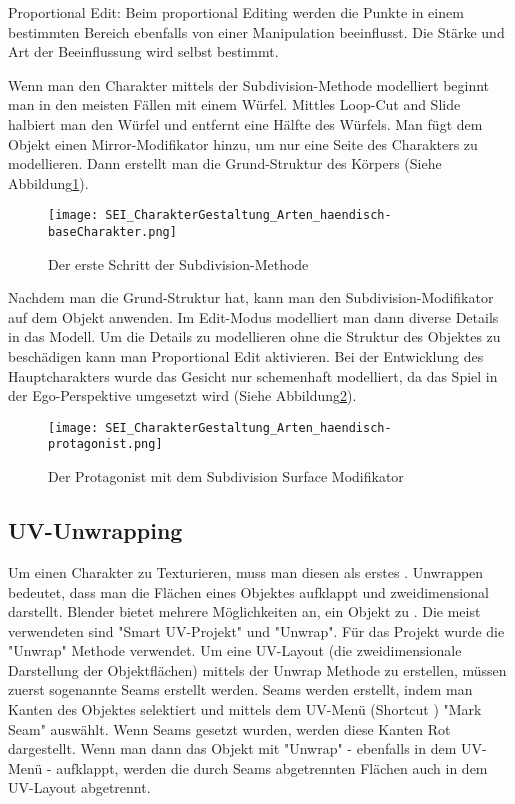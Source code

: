 Proportional Edit\citep{blender:prop_editing}:
Beim proportional Editing werden die Punkte in einem bestimmten Bereich ebenfalls von einer Manipulation beeinflusst.
Die Stärke und Art der Beeinflussung wird selbst bestimmt.


Wenn man den Charakter mittels der Subdivision-Methode modelliert beginnt man in den meisten Fällen mit einem Würfel.
Mittles Loop-Cut and Slide halbiert man den Würfel und entfernt eine Hälfte des Würfels. Man fügt dem Objekt einen
Mirror-Modifikator hinzu, um nur eine Seite des Charakters zu modellieren. Dann erstellt man die Grund-Struktur des
Körpers (Siehe Abbildung\ref{picture:base_body}).

\begin{figure}[h]
    \centering
    \texttt{[image: SEI\_CharakterGestaltung\_Arten\_haendisch-baseCharakter.png]}
    \caption{Der erste Schritt der Subdivision-Methode}
    \label{picture:base_body}
\end{figure}

Nachdem man die Grund-Struktur hat, kann man den Subdivision-Modifikator auf dem Objekt anwenden. Im Edit-Modus
modelliert man dann diverse Details in das Modell. Um die Details zu modellieren ohne die Struktur des Objektes
zu beschädigen kann man Proportional Edit aktivieren. Bei der Entwicklung des Hauptcharakters wurde das Gesicht
nur schemenhaft modelliert, da das Spiel in der Ego-Perspektive umgesetzt wird (Siehe Abbildung\ref{picture:protagonist}).

\begin{figure}[h]
    \centering
    \texttt{[image: SEI\_CharakterGestaltung\_Arten\_haendisch-protagonist.png]}
    \caption{Der Protagonist mit dem Subdivision Surface Modifikator}
    \label{picture:protagonist}
\end{figure}


\subsection{UV-Unwrapping}
\label{sec:unwrapping}

Um einen Charakter zu Texturieren, muss man diesen als erstes . Unwrappen bedeutet, dass man die Flächen
eines Objektes aufklappt und zweidimensional darstellt. Blender bietet mehrere Möglichkeiten an, ein Objekt zu
. Die meist verwendeten sind "Smart UV-Projekt"\citep{blender:smart_uv} und
"Unwrap"\citep{blender:unwrap}. Für das Projekt wurde die "Unwrap" Methode verwendet. Um eine UV-Layout
(die zweidimensionale Darstellung der Objektflächen) mittels der Unwrap Methode zu erstellen, müssen zuerst sogenannte
Seams erstellt werden\citep{blender:seams}. Seams werden erstellt, indem man Kanten des Objektes selektiert und mittels
dem UV-Menü (Shortcut ) "Mark Seam" auswählt. Wenn Seams gesetzt wurden, werden diese Kanten Rot dargestellt.
Wenn man dann das Objekt mit "Unwrap" - ebenfalls in dem UV-Menü - aufklappt, werden die durch Seams abgetrennten
Flächen auch in dem UV-Layout abgetrennt.

